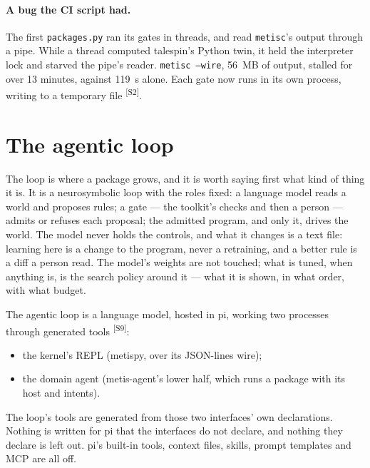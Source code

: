 \documentclass[11pt]{article}
\newcommand{\metisc}{\texttt{metisc}}
\newcommand{\src}[1]{\textsuperscript{[#1]}}
\begin{document}
\paragraph{A bug the CI script had.} The first \texttt{packages.py} ran
its gates in threads, and read \metisc's output through a pipe. While a
thread computed talespin's Python twin, it held the interpreter lock and
starved the pipe's reader. \texttt{metisc --wire}, 56~MB of output,
stalled for over 13 minutes, against 119~s alone. Each gate now runs in
its own process, writing to a temporary file \src{S2}.

\section{The agentic loop}\label{sec:loop}

The loop is where a package grows, and it is worth saying first what
kind of thing it is. It is a neurosymbolic loop with the roles fixed: a
language model reads a world and proposes rules; a gate --- the toolkit's
checks and then a person --- admits or refuses each proposal; the admitted
program, and only it, drives the world. The model never holds the
controls, and what it changes is a text file: learning here is a change
to the program, never a retraining, and a better rule is a diff a person
read. The model's weights are not touched; what is tuned, when anything
is, is the search policy around it --- what it is shown, in what order,
with what budget.

The agentic loop is a language model, hosted in pi, working two processes
through generated tools \src{S9}:
\begin{itemize}[nosep]
\item the kernel's REPL (metispy, over its JSON-lines wire);
\item the domain agent (metis-agent's lower half, which runs a package
  with its host and intents).
\end{itemize}
The loop's tools are generated from those two interfaces' own
declarations. Nothing is written for pi that the interfaces do not
declare, and nothing they declare is left out. pi's built-in tools,
context files, skills, prompt templates and MCP are all off.
\end{document}
